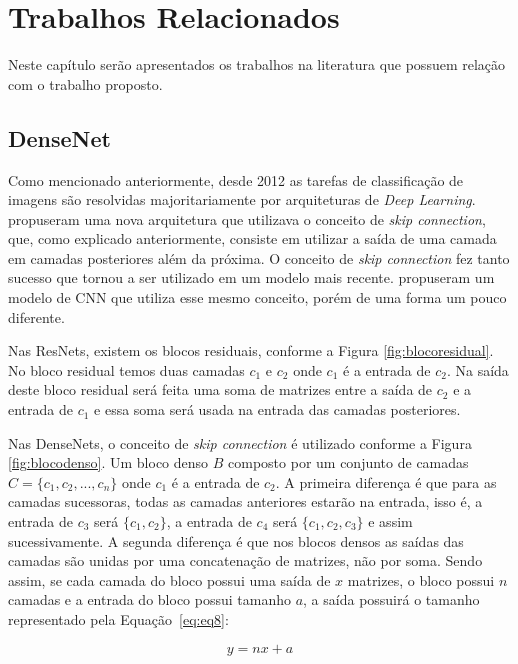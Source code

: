 \chapter{Trabalhos Relacionados}
\label{cap:3}
\vspace{-1.9cm}

Neste capítulo serão apresentados os trabalhos na literatura que possuem relação com o trabalho proposto.

\section{DenseNet}
\label{secao:3:1}

Como mencionado anteriormente, desde 2012 as tarefas de classificação de imagens são resolvidas majoritariamente por arquiteturas de \textit{Deep Learning}.  propuseram uma nova arquitetura que utilizava o conceito de \textit{skip connection}, que, como explicado anteriormente, consiste em utilizar a saída de uma camada em camadas posteriores além da próxima. O conceito de \textit{skip connection} fez tanto sucesso que tornou a ser utilizado em um modelo mais recente.  propuseram um modelo de \ac{CNN} que utiliza esse mesmo conceito, porém de uma forma um pouco diferente. 

Nas \ac{ResNet}s, existem os blocos residuais, conforme a Figura \ref{fig:blocoresidual}. No bloco residual temos duas camadas $c_1$ e $c_2$ onde $c_1$ é a entrada de $c_2$. Na saída deste bloco residual será feita uma soma de matrizes entre a saída de $c_2$ e a entrada de $c_1$ e essa soma será usada na entrada das camadas posteriores. 

Nas \ac{DenseNet}s, o conceito de \textit{skip connection} é utilizado conforme a Figura \ref{fig:blocodenso}. Um bloco denso $B$ composto por um conjunto de camadas $C = \{c_1, c_2, ..., c_n\}$ onde $c_1$ é a entrada de $c_2$. A primeira diferença é que para as camadas sucessoras, todas as camadas anteriores estarão na entrada, isso é, a entrada de $c_3$ será $\{c_1, c_2\}$, a entrada de $c_4$ será $\{c_1, c_2,c_3\}$ e assim sucessivamente. A segunda diferença é que nos blocos densos as saídas das camadas são unidas por uma concatenação de matrizes, não por soma. Sendo assim, se cada camada do bloco possui uma saída de $x$ matrizes, o bloco possui $n$ camadas e a entrada do bloco possui tamanho $a$, a saída possuirá o tamanho representado pela Equação~\ref{eq:eq8}:

\begin{equation}
	\label{eq:eq8}	y = n x + a
\end{equation}

